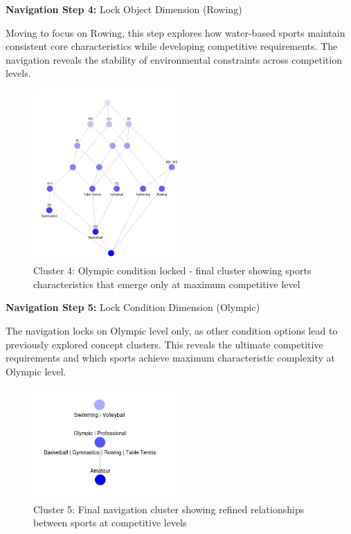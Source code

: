 \documentclass{article}
\begin{document}
\textbf{Navigation Step 4:} Lock Object Dimension (Rowing)

Moving to focus on Rowing, this step explores how water-based sports maintain consistent core characteristics while developing competitive requirements. The navigation reveals the stability of environmental constraints across competition levels.

\newpage
\begin{figure}[htbp]
  \centering
  \includegraphics[width=0.5\textwidth]{cluster_4.png}
  \caption{Cluster 4: Olympic condition locked - final cluster showing sports characteristics that emerge only at maximum competitive level}
  \label{fig:cluster_4}
\end{figure}

\textbf{Navigation Step 5:} Lock Condition Dimension (Olympic)

The navigation locks on Olympic level only, as other condition options lead to previously explored concept clusters. This reveals the ultimate competitive requirements and which sports achieve maximum characteristic complexity at Olympic level.

\newpage
\begin{figure}[htbp]
  \centering
  \includegraphics[width=0.5\textwidth]{cluster_5.png}
  \caption{Cluster 5: Final navigation cluster showing refined relationships between sports at competitive levels}
  \label{fig:cluster_5}
\end{figure}
\end{document}
